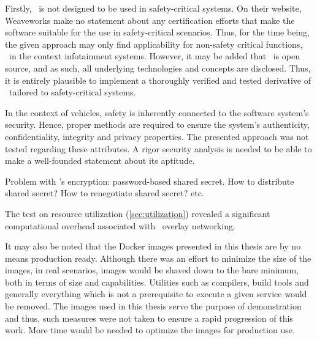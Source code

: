 Firstly, \wnet\ is not designed to be used in safety-critical systems. On their website, Weaveworks make no statement about any certification efforts that make the software suitable for the use in safety-critical scenarios. Thus, for the time being, the given approach may only find applicability for non-safety critical functions, \eg\ in the context infotainment systems. However, it may be added that \wnet\ is open source, and as such, all underlying technologies and concepts are disclosed. Thus, it is entirely plausible to implement a thoroughly verified and tested derivative of \wnet\ tailored to safety-critical systems.

In the context of vehicles, safety is inherently connected to the software system's security. Hence, proper methods are required to ensure the system's authenticity, confidentiality, integrity and privacy properties. The presented approach was not tested regarding these attributes. A rigor security analysis is needed to be able to make a well-founded statement about its aptitude.

Problem with \wnet 's encryption: password-based shared secret. How to distribute shared secret? How to renegotiate shared secret? etc.

The test on resource utilization (\cf \autoref{sec:utilization}) revealed a significant computational overhead associated with \wnet\ overlay networking. 

It may also be noted that the Docker images presented in this thesis are by no means production ready. Although there was an effort to minimize the size of the images, in real scenarios, images would be shaved down to the bare minimum, both in terms of size and capabilities. Utilities such as compilers, build tools and generally everything which is not a prerequisite to execute a given service would be removed. The images used in this thesis serve the purpose of demonstration and thus, such measures were not taken to ensure a rapid progression of this work. More time would be needed to optimize the images for production use.
